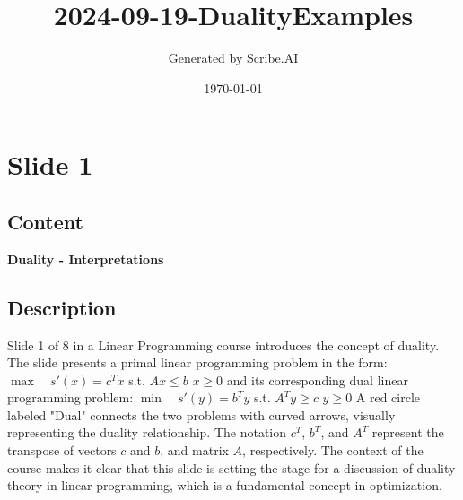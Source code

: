 \documentclass{article}%
\title{2024{-}09{-}19{-}DualityExamples}%
\author{Generated by Scribe.AI}%
\date{\today}%
\begin{document}
%
\normalsize%
\maketitle%
\section{Slide 1}%
\label{sec:Slide1}%
\subsection{Content}%

\textbf{Duality - Interpretations} \\
%
\subsection{Description}%
Slide 1 of 8 in a Linear Programming course introduces the concept of duality.  The slide presents a primal linear programming problem in the form:
$\max \quad s'(x) = c^Tx$
s.t.
$Ax \le b$
$x \ge 0$
and its corresponding dual linear programming problem:
$\min \quad s'(y) = b^Ty$
s.t.
$A^Ty \ge c$
$y \ge 0$
A red circle labeled "Dual" connects the two problems with curved arrows, visually representing the duality relationship.  The notation $c^T$, $b^T$, and $A^T$ represent the transpose of vectors $c$ and $b$, and matrix $A$, respectively. The context of the course makes it clear that this slide is setting the stage for a discussion of duality theory in linear programming, which is a fundamental concept in optimization.%
\end{document}
